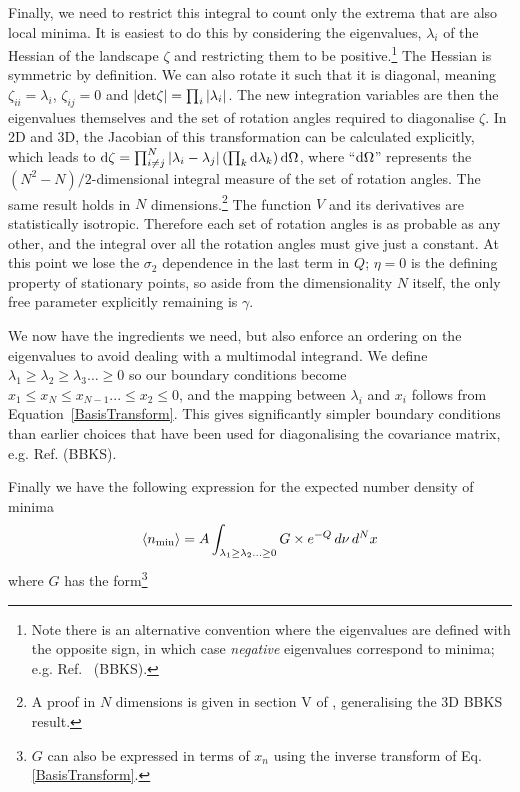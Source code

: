 \documentclass[12pt]{article}
\begin{document}
Finally, we need to restrict this integral to count only the extrema that are also local minima. It is easiest to do this by considering the eigenvalues, $\lambda_i$ of the Hessian of the landscape $\zeta$ and restricting them to be positive.\footnote{Note there is an alternative convention where the eigenvalues are defined with the opposite sign, in which case \emph{negative} eigenvalues correspond to minima; e.g. Ref.~\cite{BBKS} (BBKS).}  The Hessian is symmetric by definition. We can also rotate it such that it is diagonal, meaning  $\zeta_{ii}=\lambda_i$, $\zeta_{ij}=0$ and $|{\rm det} \zeta| = \prod_i |\lambda_i|$. The new integration variables are then the eigenvalues themselves and the set of rotation angles required to diagonalise $\zeta$.  In 2D and 3D, the Jacobian of this transformation can be calculated explicitly, which leads to  ${\rm d} \zeta = \prod_{i \neq j}^N |\lambda_i - \lambda_j|\left(\prod_k {\rm d}\lambda_k\right) {\rm d} \Omega$, where ``${\rm d}\Omega$'' represents the $(N^2-N)/2$-dimensional integral measure of the set of rotation angles. The same result holds in $N$ dimensions.\footnote{A proof in $N$ dimensions is given in section V of \cite{Easther2016}, generalising the 3D  BBKS result.} The function $V$ and its derivatives are statistically isotropic. Therefore each set of rotation angles is as probable as any other, and the integral over all the rotation angles must give just a constant. At this point we lose the $\sigma_2$ dependence in the last term in $Q$; $\eta=0$ is the defining property of stationary points, so aside from the dimensionality $N$ itself, the only free parameter explicitly remaining is $\gamma$.

We now have  the ingredients we  need, but  also enforce an ordering on the eigenvalues to avoid dealing with a multimodal integrand.  We define  $\lambda_1 \geq \lambda_2 \geq \lambda_3 \ldots \geq 0$ so our boundary conditions become $x_1\leq x_N\leq x_{N-1} ... \leq x_2 \leq 0$, and the mapping between $\lambda_i$ and $x_i$  follows from Equation~\ref{BasisTransform}. This gives significantly simpler boundary conditions than earlier choices that have been used for diagonalising the covariance matrix, e.g. Ref.\cite{BBKS} (BBKS).

Finally we have the following expression for the expected number density of minima 
%
\begin{equation} \label{DensityOfPeaks}
\langle n_{{\rm min}} \rangle = A \int_{\lambda_1 \geq \lambda_2 \ldots \geq 0} G \times e^{-Q} \, d\nu \,d^Nx
\end{equation}
%
\noindent where $G$ has the form\footnote{$G$ can also be expressed in terms of $x_n$ using the inverse transform of Eq. \ref{BasisTransform}.}
\end{document}
